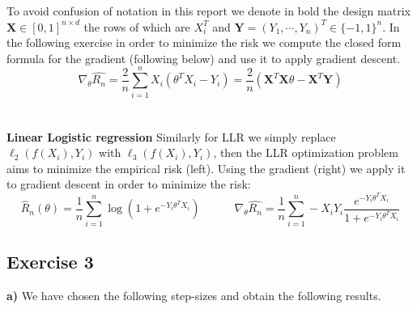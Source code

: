 \documentclass[10pt,a4paper]{article}
\begin{document}
To avoid confusion of notation in this report we denote in bold the design matrix $\mathbf{X} \in [0,1]^{n \times d}$ the rows of which are $X_i^T$  and $\mathbf{Y} = (Y_1,\cdots,Y_n)^T \in \{-1,1\}^n$. In the following exercise in order to minimize the risk we compute the closed form formula for the gradient (following below)  and use it to apply gradient descent.
$$\nabla_{\theta} \hat{R_n}= \frac{2}{n}\sum_{i=1}^n X_i(\theta^TX_i - Y_i) = \frac{2}{n} (\mathbf{X}^T\mathbf{X}\theta - \mathbf{X}^T \mathbf{Y})$$\\\\
\textbf{Linear Logistic regression} 
Similarly for LLR we simply replace $\ell_2(f(X_i),Y_i)$ with $\ell_3(f(X_i),Y_i)$, then the LLR optimization problem aims to minimize the empirical risk (left). Using the gradient (right) we apply it to gradient descent in order to minimize the risk:
$$\hat{R}_n(\theta) = \frac{1}{n} \sum ^n_{i=1}\log(1 + e^{-Y_i\theta^TX_i} ) 
\quad \quad \quad 
\nabla_{\theta}\hat{R_n} = \frac{1}{n}\sum_{i=1}^n -X_i Y_i \frac{e^{-Y_i\theta^TX_i}}{1+e^{-Y_i\theta^T X_i} } $$
\subsection*{Exercise 3}
\textbf{a)} We have chosen the following step-sizes and obtain the following results. 
\end{document}
